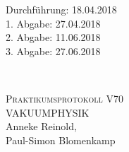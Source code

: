 



\begin{titlepage}
  \begin{flushleft}
 Durchführung: 18.04.2018\\
 1. Abgabe: 27.04.2018\\
 2. Abgabe: 11.06.2018\\
 3. Abgabe: 27.06.2018
  \end{flushleft}


\HRule\\[1,0cm]

 \begin{center}


\textsc{\LARGE Praktikumsprotokoll V70}\\[1.5cm]
\textsc{\huge VAKUUMPHYSIK} \\[5,5cm]

Anneke Reinold\footnotemark[1], \\
Paul-Simon Blomenkamp\footnotemark[2] \\[1,0cm]



 \end{center}
\HRule

 \vfill

\end{titlepage}






\printbibliography


